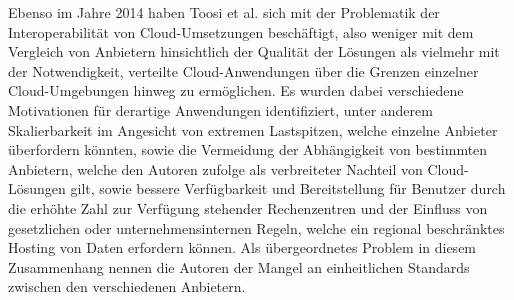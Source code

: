 %

Ebenso im Jahre 2014 haben Toosi et al. sich mit der Problematik der Interoperabilität von Cloud-Umsetzungen beschäftigt\cite{toosi2014}, also weniger mit dem Vergleich von Anbietern hinsichtlich der Qualität der Lösungen als vielmehr mit der Notwendigkeit, verteilte Cloud-Anwendungen über die Grenzen einzelner Cloud-Umgebungen hinweg zu ermöglichen. 
Es wurden dabei verschiedene Motivationen für derartige Anwendungen identifiziert, unter anderem Skalierbarkeit im Angesicht von extremen Lastspitzen, welche einzelne Anbieter überfordern könnten, sowie die Vermeidung der Abhängigkeit von bestimmten Anbietern, welche den Autoren zufolge als verbreiteter Nachteil von Cloud-Lösungen gilt, sowie bessere Verfügbarkeit und Bereitstellung für Benutzer durch die erhöhte Zahl zur Verfügung stehender Rechenzentren und der Einfluss von gesetzlichen oder unternehmensinternen Regeln, welche ein regional beschränktes Hosting von Daten erfordern können. 
Als übergeordnetes Problem in diesem Zusammenhang nennen die Autoren der Mangel an einheitlichen Standards zwischen den verschiedenen Anbietern.

